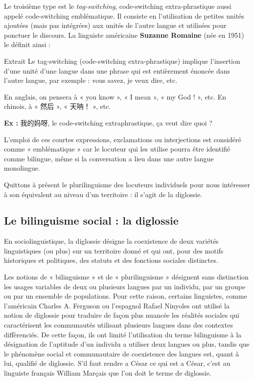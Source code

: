 Le troisième type est le \textit{tag-switching}, code-switching extra-phrastique aussi appelé code-switching emblématique. Il consiste en l’utilisation de petites unités ajoutées (mais pas intégrées) aux unités de l’autre langue et utilisées pour ponctuer le discours. La linguiste américaine \textbf{Suzanne Romaine} (née en 1951) le définit ainsi :

\begin{lecture}{Extrait}
Le tag-switching (code-switching extra-phrastique) implique l’insertion d’une unité d’une langue dans une phrase qui est entièrement énoncée dans l’autre langue, par exemple : vous savez, je veux dire, etc.
\end{lecture}

En anglais, on pensera à « you know », « I mean », « my God ! », etc. En chinois, à « 然后 », « 天呐！ », etc.

\textbf{Ex :} 我的妈呀, le code-switching extraphrastique, ça veut dire quoi ?

L’emploi de ces courtes expressions, exclamations ou interjections est considéré comme « emblématique » car le locuteur qui les utilise pourra être identifié comme bilingue, même si la conversation a lieu dans une autre langue monolingue.

Quittons à présent le plurilinguisme des locuteurs individuels pour nous intéresser à son équivalent au niveau d’un territoire : il s’agit de la diglossie.

\subsection{Le bilinguisme social : la diglossie}


En sociolinguistique, la diglossie désigne la coexistence de deux variétés linguistiques (ou plus) sur un territoire donné et qui ont, pour des motifs historiques et politiques, des statuts et des fonctions sociales distinctes.



Les notions de « bilinguisme » et de « plurilinguisme » désignent sans distinction les usages variables de deux ou plusieurs langues par un individu, par un groupe ou par un ensemble de populations. Pour cette raison, certains linguistes, comme l’américain Charles A. Ferguson ou l’espagnol Rafael Ninyoles ont utilisé la notion de diglossie pour traduire de façon plus nuancée les réalités sociales qui caractérisent les communautés utilisant plusieurs langues dans des contextes diffèrenciés. De cette façon, ils ont limité l’utilisation du terme bilinguisme à la désignation de l’aptitude d’un individu a utiliser deux langues ou plus, tandis que le phénomène social et communautaire de coexistence des langues est, quant à lui, qualifié de diglossie. S’il faut rendre a César ce qui est a César, c’est au linguiste français William Marçais que l’on doit le terme de diglossie.


